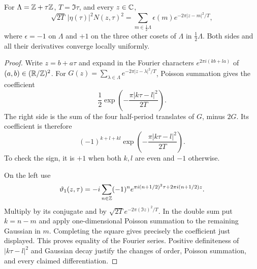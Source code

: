 \begin{statement}
For $\Lambda=\mathbb Z+\tau\mathbb Z$, $T=\Im\tau$, and every $z\in\mathbb C$,
\[
 \sqrt{2T}\,|\eta(\tau)|^2N(z,\tau)^2
 =\sum_{m\in\frac12\Lambda}\epsilon(m)
                         e^{-2\pi|z-m|^2/T},
\]
where $\epsilon=-1$ on $\Lambda$ and $+1$ on the three other
cosets of $\Lambda$ in $\frac12\Lambda$.
Both sides and all their derivatives converge locally uniformly.
\end{statement}
\begin{proof}
Write $z=b+a\tau$ and expand in the Fourier characters
$e^{2\pi i(kb+la)}$ of $(a,b)\in(\mathbb R/\mathbb Z)^2$.
For $G(z)=\sum_{\lambda\in\Lambda}e^{-2\pi|z-\lambda|^2/T}$,
Poisson summation gives the coefficient
\[
 \frac12\exp\left(-\frac{\pi|k\tau-l|^2}{2T}\right).
\]
The right side is the sum of the four half-period translates
of $G$, minus $2G$. Its coefficient is therefore
\[
 (-1)^{k+l+kl}
       \exp\left(-\frac{\pi|k\tau-l|^2}{2T}\right).
\]
To check the sign, it is $+1$ when both $k,l$ are even and
$-1$ otherwise.

On the left use
\[
 \vartheta_1(z,\tau)
 =-i\sum_{n\in\mathbb Z}(-1)^n
        e^{\pi i(n+1/2)^2\tau+2\pi i(n+1/2)z}.
\]
Multiply by its conjugate and by
$\sqrt{2T}e^{-2\pi(\Im z)^2/T}$.
In the double sum put $k=n-m$ and apply one-dimensional
Poisson summation to the remaining Gaussian in $m$.
Completing the square gives precisely the coefficient just
displayed. This proves equality of the Fourier series.
Positive definiteness of $|k\tau-l|^2$ and Gaussian decay
justify the changes of order, Poisson summation, and every
claimed differentiation.
\end{proof}

